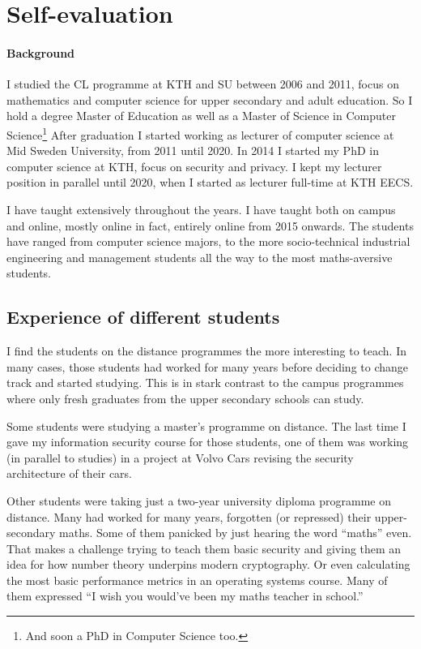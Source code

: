 \section{Self-evaluation}


\paragraph{Background}

I studied the CL programme at KTH and SU between 2006 and 2011, focus on 
mathematics and computer science for upper secondary and adult education.
So I hold a degree Master of Education as well as a Master of Science in 
Computer Science\footnote{%
  And soon a PhD in Computer Science too.
}
After graduation I started working as lecturer of computer science at Mid 
Sweden University, from 2011 until 2020.
In 2014 I started my PhD in computer science at KTH, focus on security and 
privacy.
I kept my lecturer position in parallel until 2020, when I started as lecturer 
full-time at KTH EECS.

I have taught extensively throughout the years.
I have taught both on campus and online, mostly online in fact, entirely online 
from 2015 onwards.
The students have ranged from computer science majors, to the more 
socio-technical industrial engineering and management students all the way to 
the most maths-aversive students.

\subsection{Experience of different students}

I find the students on the distance programmes the more interesting to teach.
In many cases, those students had worked for many years before deciding to 
change track and started studying.
This is in stark contrast to the campus programmes where only fresh graduates 
from the upper secondary schools can study.

Some students were studying a master's programme on distance.
The last time I gave my information security course for those students, one of 
them was working (in parallel to studies) in a project at Volvo Cars revising 
the security architecture of their cars.

Other students were taking just a two-year university diploma programme on 
distance.
Many had worked for many years, forgotten (or repressed) their upper-secondary 
maths.
Some of them panicked by just hearing the word \enquote{maths} even.
That makes a challenge trying to teach them basic security and giving them an 
idea for how number theory underpins modern cryptography.
Or even calculating the most basic performance metrics in an operating systems 
course.
Many of them expressed \enquote{I wish you would've been my maths teacher in 
school.}

